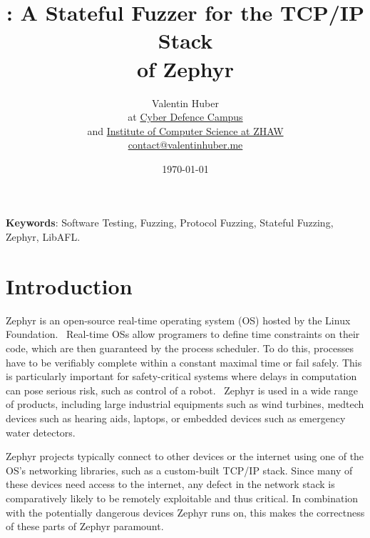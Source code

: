 \documentclass[twocolumn]{article}
\title{%
    \vspace{50px}%
    \Huge \proj : A Stateful Fuzzer for the TCP/IP Stack\\of Zephyr
    \vspace{250px}%
}
\author{%
    Valentin Huber\vspace{5px}\\%
    \small at \href{https://www.cydcampus.admin.ch/}{Cyber Defence Campus}\\%
    \small and \href{https://www.zhaw.ch/en/engineering/institutes-centres/init/}{Institute of Computer Science at ZHAW}\\%
    \small \href{mailto://contact@valentinhuber.me}{contact@valentinhuber.me}%
    \vspace{10px}
    \todo{fix title page}
}
\date{\today}
\let\savedCite=\cite
\renewcommand{\cite}{\unskip~\savedCite}
\begin{document}
\maketitle

\clearpage\newpage
\onecolumn
\begin{center}
  \begin{minipage}{0.8\textwidth}
    \vspace{70px}
    \begin{abstract}
      \lipsum[1]\lipsum[2]\lipsum[3]
    \end{abstract}
  \end{minipage}
  \vspace{70px}

  \begin{minipage}{0.7\textwidth}
    \textbf{Keywords}: Software Testing, Fuzzing, Protocol Fuzzing, Stateful Fuzzing, Zephyr, LibAFL.
  \end{minipage}
\end{center}
\twocolumn

\clearpage\newpage

\tableofcontents


\section{Introduction}
\label{Introduction}

Zephyr is an open-source real-time operating system (OS) hosted by the Linux Foundation.\cite{ZephyrAbout} Real-time OSs allow programers to define time constraints on their code, which are then guaranteed by the process scheduler. To do this, processes have to be verifiably complete within a constant maximal time or fail safely. This is particularly important for safety-critical systems where delays in computation can pose serious risk, such as control of a robot.\cite{RTOSWiki} Zephyr is used in a wide range of products, including large industrial equipments such as wind turbines, medtech devices such as hearing aids, laptops, or embedded devices such as emergency water detectors.\cite{ZephyrUsedIn}

Zephyr projects typically connect to other devices or the internet using one of the OS's networking libraries, such as a custom-built TCP/IP stack. Since many of these devices need access to the internet, any defect in the network stack is comparatively likely to be remotely exploitable and thus critical. In combination with the potentially dangerous devices Zephyr runs on, this makes the correctness of these parts of Zephyr paramount.
\end{document}
